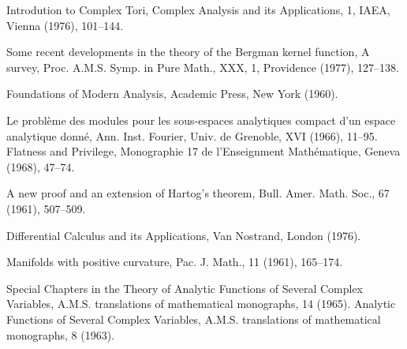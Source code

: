 \begin{sourcebibliography}
 Introdution to Complex Tori, Complex Analysis and its Applications, 1, IAEA, Vienna (1976), 101--144.
\end{sourcebibliography}
\begin{sourcebibliography}
 Some recent developments in the theory of the Bergman kernel function, A survey, Proc. A.M.S. Symp. in Pure Math., XXX, 1, Providence (1977), 127--138.
\end{sourcebibliography}
\begin{sourcebibliography}
 Foundations of Modern Analysis, Academic Press, New York (1960).
\end{sourcebibliography}
\begin{sourcebibliography}
 Le probl\`eme des modules pour les sous-espaces analytiques compact d'un espace analytique donn\'e, Ann. Inst. Fourier, Univ. de Grenoble, XVI (1966), 11--95.
 Flatness and Privilege, Monographie 17 de l'Enseignment Math\'ematique, Geneva (1968), 47--74.
\end{sourcebibliography}
\begin{sourcebibliography}
 A new proof and an extension of Hartog's theorem, Bull. Amer. Math. Soc., 67 (1961), 507--509.
\end{sourcebibliography}
\begin{sourcebibliography}
 Differential Calculus and its Applications, Van Nostrand, London (1976).
\end{sourcebibliography}
\begin{sourcebibliography}
 Manifolds with positive curvature, Pac. J. Math., 11 (1961), 165--174.
\end{sourcebibliography}
\begin{sourcebibliography}
 Special Chapters in the Theory of Analytic Functions of Several Complex Variables, A.M.S. translations of mathematical monographs, 14 (1965).
 Analytic Functions of Several Complex Variables, A.M.S. translations of mathematical monographs, 8 (1963).
\end{sourcebibliography}
